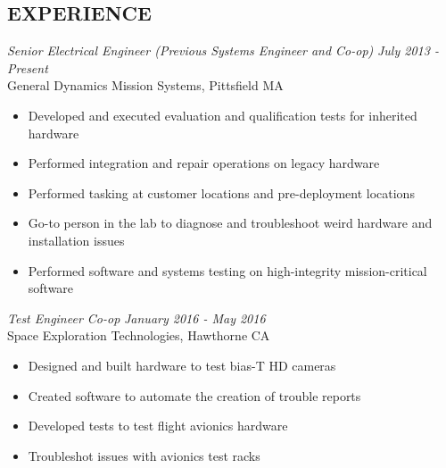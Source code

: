 \documentclass[line,mmmargin]{res}
\begin{document}
\begin{resume}
\section{EXPERIENCE} 
{\sl Senior Electrical Engineer (Previous Systems Engineer and Co-op)} \hfill {\sl July 2013 - Present }\\
	General Dynamics Mission Systems, Pittsfield MA
	\begin{itemize}  \itemsep -2pt %
		\item Developed and executed evaluation and qualification tests for inherited hardware
		\item Performed integration and repair operations on legacy hardware
		\item Performed tasking at customer locations and pre-deployment locations
		\item Go-to person in the lab to diagnose and troubleshoot weird hardware and installation issues
		\item Performed software and systems testing on high-integrity mission-critical software
	\end{itemize}
	\vspace{-10pt}
{\sl  Test Engineer Co-op} \hfill {\sl January 2016 - May 2016}\\
	Space Exploration Technologies, Hawthorne CA
	\begin{itemize}  \itemsep -2pt %
		\item Designed and built hardware to test bias-T HD cameras
		\item Created software to automate the creation of trouble reports
		\item Developed tests to test flight avionics hardware
		\item Troubleshot issues with avionics test racks
	\end{itemize}
 


\end{resume}
\end{document}
